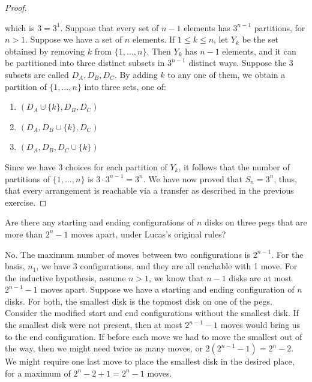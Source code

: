 \documentclass[12pt]{article}
\newenvironment{ex}[2][Exercise]{\begin{trivlist}
		\item[\hskip \labelsep {\bfseries #1}\hskip \labelsep {\bfseries #2.}]}{\end{trivlist}}
\newenvironment{sol}[1][Solution]{\begin{trivlist}
		\item[\hskip \labelsep {\bfseries #1:}]}{\end{trivlist}}
\begin{document}
\begin{sol}
\begin{proof}
\begin{enumerate}
		\end{enumerate}
		which is $3=3^1$. Suppose that every set of $n-1$ elements has $3^{n-1}$
		partitions, for $n>1$. Suppose we have a set of $n$ elements.
		If $1\leq k\leq n$, let $Y_k$ be the set obtained by removing $k$
		from $\{1,\ldots, n\}$. Then $Y_k$ has $n-1$ elements, and it can be
		partitioned into three distinct subsets in $3^{n-1}$ distinct ways.
		Suppose the 3 subsets are called $D_A, D_B, D_C$. By adding $k$
		to any one of them, we obtain a partition of $\{1, \ldots, n\}$ into
		three sets, one of:
		\begin{enumerate}
			\item $(D_A\cup\{k\}, D_B, D_C)$
			\item $(D_A, D_B\cup\{k\}, D_C)$
			\item $(D_A, D_B, D_C\cup\{k\})$
		\end{enumerate}
		Since we have 3 choices for each partition of $Y_k$, it follows that
		the number of partitions of $\{1,\ldots,n\}$ is $3\cdot 3^{n-1}=3^n$.
		We have now proved that $S_n=3^{n}$, thus, that every arrangement is
		reachable via a transfer as described in the previous exercise.
	\end{proof}
\end{sol}

\begin{ex}{4}
	Are there any starting and ending configurations of $n$ disks on three
	pegs that are more than $2^{n}-1$ moves apart, under Lucas's original rules?
\end{ex}

\begin{sol}
	No. The maximum number of moves between two configurations is $2^{n-1}$. For the basis,
	$n_1$, we have 3 configurations, and they are all reachable with 1 move.
	For the inductive hypothesis, assume $n>1$, we know that $n-1$ disks
	are at most $2^{n-1}-1$ moves apart. Suppose we have a starting and ending configuration
	of $n$ disks. For both, the smallest disk is the topmost disk on one of the pegs.
	Consider the modified start and end configurations without the smallest disk.
	If the smallest disk were not present, then at most $2^{n-1}-1$ moves would bring us
	to the end configuration. If before each move we had to move the smallest out of the
	way, then we might need twice as many moves, or $2(2^{n-1}-1)=2^n-2$. We might
	require one last move to place the smallest disk in the desired place, 
	for a maximum of $2^{n}-2+1=2^{n}-1$ moves.
\end{sol}
\end{document}
